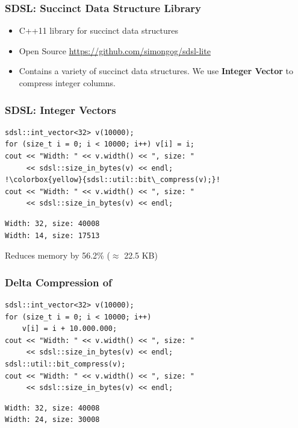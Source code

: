 \documentclass[aspectratio=43]{beamer}
\begin{document}
\begin{frame}
    \frametitle{SDSL: Succinct Data Structure Library}

    \begin{itemize}
        \item C++11 library for succinct data structures
        \item Open Source \url{https://github.com/simongog/sdsl-lite}
        \item Contains a variety of succinct data structures. 
        We use \textbf{Integer Vector} to compress integer columns.
    \end{itemize}
\end{frame}


\begin{frame}[fragile]
    \frametitle{SDSL: Integer Vectors}

\begin{lstlisting}[style=C++,escapechar=!]
sdsl::int_vector<32> v(10000);
for (size_t i = 0; i < 10000; i++) v[i] = i;
cout << "Width: " << v.width() << ", size: " 
     << sdsl::size_in_bytes(v) << endl;
!\colorbox{yellow}{sdsl::util::bit\_compress(v);}!
cout << "Width: " << v.width() << ", size: " 
     << sdsl::size_in_bytes(v) << endl;
\end{lstlisting}

\pause

\begin{lstlisting}[style=shell]
Width: 32, size: 40008
Width: 14, size: 17513
\end{lstlisting}

\pause

\begin{center}
    Reduces memory by 56.2\% ($\approx$ 22.5 KB)
\end{center}
\end{frame}


\begin{frame}[fragile]
    \frametitle{Delta Compression of }

\begin{lstlisting}[style=C++]
sdsl::int_vector<32> v(10000);
for (size_t i = 0; i < 10000; i++) 
    v[i] = i + 10.000.000;
cout << "Width: " << v.width() << ", size: " 
     << sdsl::size_in_bytes(v) << endl;
sdsl::util::bit_compress(v);
cout << "Width: " << v.width() << ", size: " 
     << sdsl::size_in_bytes(v) << endl;
\end{lstlisting}

\begin{lstlisting}[style=shell]
Width: 32, size: 40008
Width: 24, size: 30008
\end{lstlisting}
\end{frame}
\end{document}
